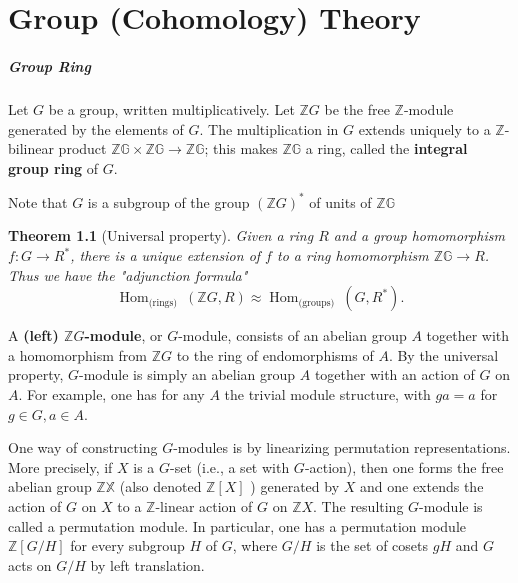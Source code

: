 \documentclass{book}
\newtheorem{theo}{Theorem}
\begin{document}
\chapter{Group (Cohomology) Theory} 







\paragraph*{Group Ring}

Let $G$ be a group, written multiplicatively. Let $\mathbb{Z} G$ be the free $\mathbb{Z}$-module generated by the elements of $G$. The multiplication in $G$ extends uniquely to a $\mathbb{Z}$-bilinear product $\mathbb{Z G} \times \mathbb{Z G} \rightarrow \mathbb{Z G}$; this makes $\mathbb{Z G}$ a ring, called the \textbf{integral group ring} of $G$.

Note that $G$ is a subgroup of the group $(\mathbb{Z} G)^*$ of units of $\mathbb{Z G}$ 
\begin{theo}[Universal property]
Given a ring $R$ and a group homomorphism $f: G \rightarrow R^*$, there is a unique extension of $f$ to a ring homomorphism $\mathbb{Z G} \rightarrow R$. Thus we have the "adjunction formula"
    $$
    \operatorname{Hom}_{\text {(rings) }}(\mathbb{Z} G, R) \approx \operatorname{Hom}_{\text {(groups) }}\left(G, R^*\right) .
    $$
\end{theo}

A \textbf{(left) $\mathbb{Z} G$-module}, or $G$-module, consists of an abelian group $A$ together with a homomorphism from $\mathbb{Z} G$ to the ring of endomorphisms of $A$. By the universal property, $G$-module is simply an abelian group $A$ together with an action of $G$ on $A$. For example, one has for any $A$ the trivial module structure, with $g a=a$ for $g \in G, a \in A$.

One way of constructing $G$-modules is by linearizing permutation representations. More precisely, if $X$ is a $G$-set (i.e., a set with $G$-action), then one forms the free abelian group $\mathbb{Z X}$ (also denoted $\mathbb{Z}[X]$ ) generated by $X$ and one extends the action of $G$ on $X$ to a $\mathbb{Z}$-linear action of $G$ on $\mathbb{Z} X$. The resulting $G$-module is called a permutation module. In particular, one has a permutation module $\mathbb{Z}[G / H]$ for every subgroup $H$ of $G$, where $G / H$ is the set of cosets $g H$ and $G$ acts on $G / H$ by left translation.
\end{document}

